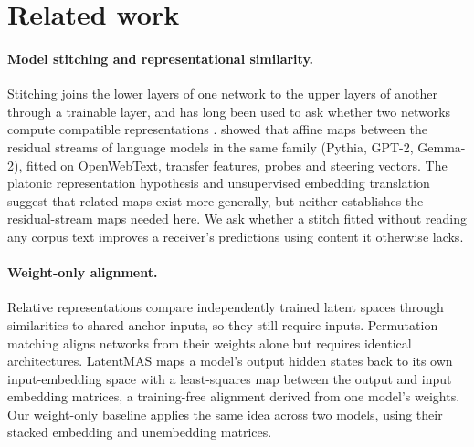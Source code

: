 \section{Related work}
\label{sec:related}

\paragraph{Model stitching and representational similarity.}
Stitching joins the lower layers of one network to the upper layers of another through a trainable layer, and has long been used to ask whether two networks compute compatible representations \citep{lenc2015equivariance,bansal2021stitching}. \citet{chen2025stitching} showed that affine maps between the residual streams of language models in the same family (Pythia, GPT-2, Gemma-2), fitted on OpenWebText, transfer features, probes and steering vectors. The platonic representation hypothesis \citep{huh2024platonic} and unsupervised embedding translation \citep{jha2025vec2vec} suggest that related maps exist more generally, but neither establishes the residual-stream maps needed here. We ask whether a stitch fitted without reading any corpus text improves a receiver's predictions using content it otherwise lacks.

\paragraph{Weight-only alignment.}
Relative representations \citep{moschella2023relative} compare independently trained latent spaces through similarities to shared anchor inputs, so they still require inputs. Permutation matching \citep{ainsworth2023rebasin} aligns networks from their weights alone but requires identical architectures. LatentMAS \citep{zou2025latentmas} maps a model's output hidden states back to its own input-embedding space with a least-squares map between the output and input embedding matrices, a training-free alignment derived from one model's weights. Our weight-only baseline applies the same idea across two models, using their stacked embedding and unembedding matrices.

